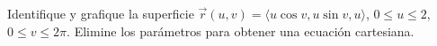 Identifique y grafique la superficie $\vec r(u,v)=\langle u\cos v,u\sin v,u\rangle$, $0\leq u\leq2$, $0\leq v\leq2\pi$. Elimine los parámetros para obtener una ecuación cartesiana.
